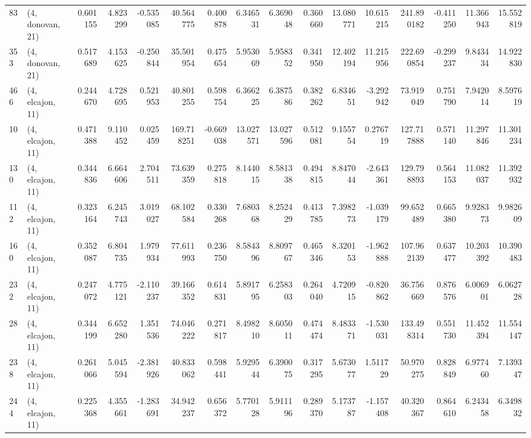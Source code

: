 \begin{tabular}{llrrrrrrrrrrrrrr}
83  &  (4, donovan, 21) &   0.601155 &   4.823299 &  -0.535085 &    40.564775 &   0.400878 &   6.346531 &   6.369048 &  0.360660 &  13.080771 &  10.615215 &    241.890182 &  -0.411250 &  11.366943 &   15.552819 \\
353 &  (4, donovan, 21) &   0.517689 &   4.153625 &  -0.250844 &    35.501954 &   0.475654 &   5.953069 &   5.958352 &  0.341950 &  12.402194 &  11.215956 &    222.690854 &  -0.299237 &   9.843434 &   14.922830 \\
466 &  (4, elcajon, 11) &   0.244670 &   4.728695 &   0.521953 &    40.801255 &   0.598754 &   6.366225 &   6.387586 &  0.382262 &   6.834651 &  -3.292942 &     73.919049 &   0.751790 &   7.942014 &    8.597619 \\
10  &  (4, elcajon, 11) &   0.471388 &   9.110452 &   0.025459 &   169.718251 &  -0.669038 &  13.027571 &  13.027596 &  0.512081 &   9.155754 &   0.276719 &    127.717888 &   0.571140 &  11.297846 &   11.301234 \\
130 &  (4, elcajon, 11) &   0.344836 &   6.664606 &   2.704511 &    73.639359 &   0.275818 &   8.144015 &   8.581338 &  0.494815 &   8.847044 &  -2.643361 &    129.798893 &   0.564153 &  11.082037 &   11.392932 \\
112 &  (4, elcajon, 11) &   0.323164 &   6.245743 &   3.019027 &    68.102584 &   0.330268 &   7.680368 &   8.252429 &  0.413785 &   7.398273 &  -1.039179 &     99.652489 &   0.665380 &   9.928373 &    9.982609 \\
160 &  (4, elcajon, 11) &   0.352087 &   6.804735 &   1.979934 &    77.611993 &   0.236750 &   8.584396 &   8.809767 &  0.465346 &   8.320153 &  -1.962888 &    107.962139 &   0.637477 &  10.203392 &   10.390483 \\
232 &  (4, elcajon, 11) &   0.247072 &   4.775121 &  -2.110237 &    39.166352 &   0.614831 &   5.891795 &   6.258303 &  0.264040 &   4.720915 &  -0.820862 &     36.756669 &   0.876576 &   6.006901 &    6.062728 \\
28  &  (4, elcajon, 11) &   0.344199 &   6.652280 &   1.351536 &    74.046222 &   0.271817 &   8.498210 &   8.605011 &  0.474474 &   8.483371 &  -1.530031 &    133.498314 &   0.551730 &  11.452394 &   11.554147 \\
238 &  (4, elcajon, 11) &   0.261066 &   5.045594 &  -2.381926 &    40.833062 &   0.598441 &   5.929544 &   6.390075 &  0.317295 &   5.673077 &   1.511729 &     50.970275 &   0.828849 &   6.977460 &    7.139347 \\
244 &  (4, elcajon, 11) &   0.225368 &   4.355661 &  -1.283691 &    34.942237 &   0.656372 &   5.770128 &   5.911196 &  0.289370 &   5.173787 &  -1.157408 &     40.320367 &   0.864610 &   6.243458 &    6.349832 \\

\end{tabular}
